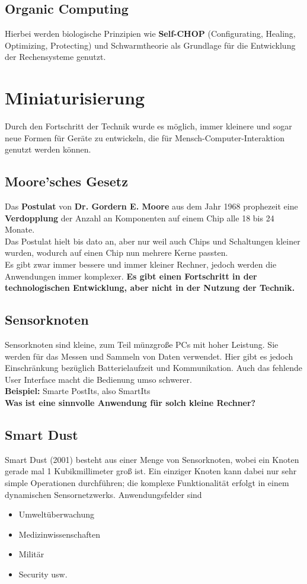 \documentclass[a4paper]{article}
\begin{document}
\subsection{Organic Computing}
Hierbei werden biologische Prinzipien wie \textbf{Self-CHOP} (Configurating, Healing, Optimizing, Protecting)  und Schwarmtheorie als Grundlage für die Entwicklung der Rechensysteme genutzt. 

\newpage
\section{Miniaturisierung}
Durch den Fortschritt der Technik wurde es möglich, immer kleinere und sogar neue Formen für Geräte zu entwickeln, die für Mensch-Computer-Interaktion genutzt werden können.
\subsection{Moore'sches Gesetz}
Das \textbf{Postulat} von \textbf{Dr. Gordern E. Moore} aus dem Jahr 1968 prophezeit eine \textbf{Verdopplung} der Anzahl an Komponenten auf einem Chip alle 18 bis 24 Monate.\\

Das Postulat hielt bis dato an, aber nur weil auch Chips und Schaltungen kleiner wurden, wodurch auf einen Chip nun mehrere Kerne passten.\\

Es gibt zwar immer bessere und immer kleiner Rechner, jedoch werden die Anwendungen immer komplexer. \textbf{Es gibt einen Fortschritt in der technologischen Entwicklung, aber nicht in der Nutzung der Technik.}

\subsection{Sensorknoten}
Sensorknoten sind kleine, zum Teil münzgroße PCs mit hoher Leistung. Sie werden für das Messen und Sammeln von Daten verwendet. Hier gibt es jedoch Einschränkung bezüglich Batterielaufzeit und Kommunikation. Auch das fehlende User Interface macht die Bedienung umso schwerer.\\
\textbf{Beispiel:} Smarte PostIts, also SmartIts\\

\textbf{Was ist eine sinnvolle Anwendung für solch kleine Rechner?}

\subsection{Smart Dust}
Smart Dust (2001) besteht aus einer Menge von Sensorknoten, wobei ein Knoten gerade mal 1 Kubikmillimeter groß ist. Ein einziger Knoten kann dabei nur sehr simple Operationen durchführen; die komplexe Funktionalität erfolgt in einem dynamischen Sensornetzwerks. Anwendungsfelder sind
\begin{itemize}
	\item Umweltüberwachung
	\item Medizinwissenschaften
	\item Militär
	\item Security usw.
\end{itemize} 
\end{document}
